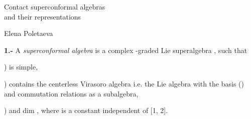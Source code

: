 \documentclass[a4paper,a4paper]{article}
\begin{document}
\begin{center}
{\Large Contact superconformal algebras}\\
{\Large and their representations}
\end{center}
\vskip 0.1in
\begin{center}
{\large Elena Poletaeva}
\end{center}
\vskip 0.1in

{\bf 1.-}
A {\it superconformal algebra}  is a complex
\coordHE{}-graded Lie superalgebra \coordHE{}, such that

) \coordHE{} is simple,

) \coordHE{} contains the centerless Virasoro algebra 
i.e. the Lie algebra with the basis \coordHE{} (\coordHE{}) and commutation relations
\coordHE{} as a subalgebra,

) \coordHE{} and dim \coordHE{},
where \coordHE{} is a constant independent of \coordHE{} [1, 2].
\end{document}
